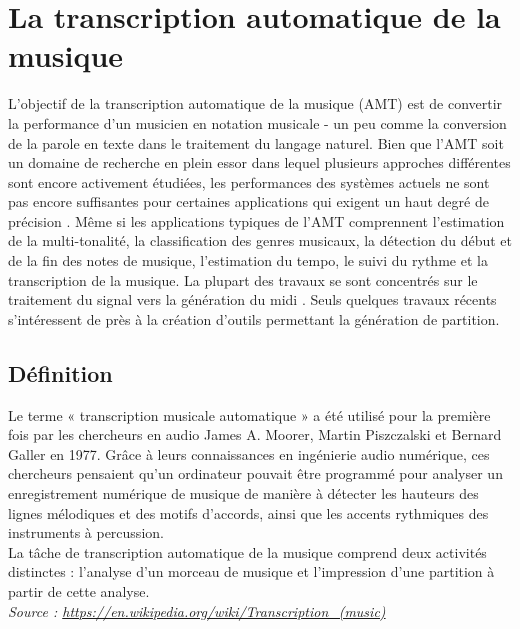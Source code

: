 \section{La transcription automatique de la musique}
L'objectif de la transcription automatique de la musique (AMT) \cite{article1} est de convertir la performance d'un musicien en notation musicale - un peu comme la conversion de la parole en texte dans le traitement du langage naturel. Bien que l’AMT soit un domaine de recherche en plein essor dans lequel plusieurs approches différentes sont encore activement étudiées, les performances des systèmes actuels ne sont pas encore suffisantes pour certaines applications qui exigent un haut degré de précision \cite{article1}. Même si les applications typiques de l'AMT comprennent l'estimation de la multi-tonalité, la classification des genres musicaux, la détection du début et de la fin des notes de musique, l'estimation du tempo, le suivi du rythme et la transcription de la musique. La plupart des travaux se sont concentrés sur le traitement du signal vers la génération du midi \cite{article2}. Seuls quelques travaux récents \cite{foscarin:hal-01988990} s’intéressent de près à la création d’outils permettant la génération de partition.
\subsection*{Définition}
Le terme « transcription musicale automatique » a été utilisé pour la première fois par les chercheurs en audio James A. Moorer, Martin Piszczalski et Bernard Galler en 1977. Grâce à leurs connaissances en ingénierie audio numérique, ces chercheurs pensaient qu'un ordinateur pouvait être programmé pour analyser un enregistrement numérique de musique de manière à détecter les hauteurs des lignes mélodiques et des motifs d'accords, ainsi que les accents rythmiques des instruments à percussion.\\La tâche de transcription automatique de la musique comprend deux activités distinctes : l'analyse d'un morceau de musique et l'impression d'une partition à partir de cette analyse.\\
\textit{Source : \url{https://en.wikipedia.org/wiki/Transcription_(music)}}
